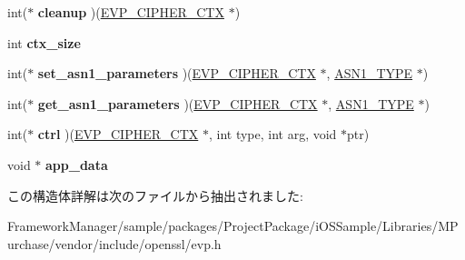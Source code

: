 \begin{DoxyCompactItemize}
\item 
\hypertarget{structevp__cipher__st_ab5d28076841224e07599d579fb7c0d28}{}int($\ast$ {\bfseries cleanup} )(\hyperlink{structevp__cipher__ctx__st}{E\+V\+P\+\_\+\+C\+I\+P\+H\+E\+R\+\_\+\+C\+T\+X} $\ast$)\label{structevp__cipher__st_ab5d28076841224e07599d579fb7c0d28}

\item 
\hypertarget{structevp__cipher__st_a856751b3bf79b35b6178f574dea3d1bc}{}int {\bfseries ctx\+\_\+size}\label{structevp__cipher__st_a856751b3bf79b35b6178f574dea3d1bc}

\item 
\hypertarget{structevp__cipher__st_aca59cfca681fefba705b0c58f9956e9b}{}int($\ast$ {\bfseries set\+\_\+asn1\+\_\+parameters} )(\hyperlink{structevp__cipher__ctx__st}{E\+V\+P\+\_\+\+C\+I\+P\+H\+E\+R\+\_\+\+C\+T\+X} $\ast$, \hyperlink{structasn1__type__st}{A\+S\+N1\+\_\+\+T\+Y\+P\+E} $\ast$)\label{structevp__cipher__st_aca59cfca681fefba705b0c58f9956e9b}

\item 
\hypertarget{structevp__cipher__st_a438856068bda2e643c3e1a713d77ad66}{}int($\ast$ {\bfseries get\+\_\+asn1\+\_\+parameters} )(\hyperlink{structevp__cipher__ctx__st}{E\+V\+P\+\_\+\+C\+I\+P\+H\+E\+R\+\_\+\+C\+T\+X} $\ast$, \hyperlink{structasn1__type__st}{A\+S\+N1\+\_\+\+T\+Y\+P\+E} $\ast$)\label{structevp__cipher__st_a438856068bda2e643c3e1a713d77ad66}

\item 
\hypertarget{structevp__cipher__st_a7f3ad30b0b90b5740b831b9e7aa43cbe}{}int($\ast$ {\bfseries ctrl} )(\hyperlink{structevp__cipher__ctx__st}{E\+V\+P\+\_\+\+C\+I\+P\+H\+E\+R\+\_\+\+C\+T\+X} $\ast$, int type, int arg, void $\ast$ptr)\label{structevp__cipher__st_a7f3ad30b0b90b5740b831b9e7aa43cbe}

\item 
\hypertarget{structevp__cipher__st_a11371711dc0f64bacf01b3ad72cf90f3}{}void $\ast$ {\bfseries app\+\_\+data}\label{structevp__cipher__st_a11371711dc0f64bacf01b3ad72cf90f3}

\end{DoxyCompactItemize}


この構造体詳解は次のファイルから抽出されました\+:\begin{DoxyCompactItemize}
\item 
Framework\+Manager/sample/packages/\+Project\+Package/i\+O\+S\+Sample/\+Libraries/\+M\+Purchase/vendor/include/openssl/evp.\+h\end{DoxyCompactItemize}
